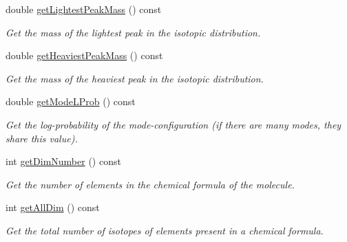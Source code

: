 \begin{DoxyCompactItemize}
\mbox{\label{class_iso_spec_1_1_iso_a7541599fbc29dd374bb60e5eb8fc047d}} 
double \mbox{\hyperlink{class_iso_spec_1_1_iso_a7541599fbc29dd374bb60e5eb8fc047d}{get\+Lightest\+Peak\+Mass}} () const
\begin{DoxyCompactList}\small\item\em Get the mass of the lightest peak in the isotopic distribution. \end{DoxyCompactList}\item 
\mbox{\label{class_iso_spec_1_1_iso_a1ede5e34e5bbbb22ae89b362ce2c6faf}} 
double \mbox{\hyperlink{class_iso_spec_1_1_iso_a1ede5e34e5bbbb22ae89b362ce2c6faf}{get\+Heaviest\+Peak\+Mass}} () const
\begin{DoxyCompactList}\small\item\em Get the mass of the heaviest peak in the isotopic distribution. \end{DoxyCompactList}\item 
\mbox{\label{class_iso_spec_1_1_iso_a9035d076cec8f937d971e3fd972aa83f}} 
double \mbox{\hyperlink{class_iso_spec_1_1_iso_a9035d076cec8f937d971e3fd972aa83f}{get\+Mode\+L\+Prob}} () const
\begin{DoxyCompactList}\small\item\em Get the log-\/probability of the mode-\/configuration (if there are many modes, they share this value). \end{DoxyCompactList}\item 
\mbox{\label{class_iso_spec_1_1_iso_a62b17f48d86f62b5ed38ffb296a9daa5}} 
int \mbox{\hyperlink{class_iso_spec_1_1_iso_a62b17f48d86f62b5ed38ffb296a9daa5}{get\+Dim\+Number}} () const
\begin{DoxyCompactList}\small\item\em Get the number of elements in the chemical formula of the molecule. \end{DoxyCompactList}\item 
\mbox{\label{class_iso_spec_1_1_iso_a656a37dd84a6c0534b2373210ed5a091}} 
int \mbox{\hyperlink{class_iso_spec_1_1_iso_a656a37dd84a6c0534b2373210ed5a091}{get\+All\+Dim}} () const
\begin{DoxyCompactList}\small\item\em Get the total number of isotopes of elements present in a chemical formula. \end{DoxyCompactList}\end{DoxyCompactItemize}
